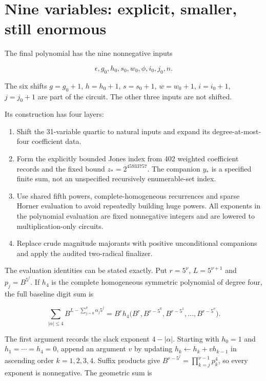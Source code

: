 \documentclass[
  10pt,
]{article}
\providecommand{\tightlist}{%
  \setlength{\itemsep}{0pt}\setlength{\parskip}{0pt}}
\let\oldsection\section
\renewcommand{\section}{\clearpage\oldsection}
\begin{document}
\section{Nine variables: explicit, smaller, still
enormous}\label{nine-variables-explicit-smaller-still-enormous}

The final polynomial has the nine nonnegative inputs

\[\epsilon, g_0, h_0, s_0, w_0,\phi, i_0, j_0, n.\]

The six shifts \(g=g_0+1\), \(h=h_0+1\), \(s=s_0+1\), \(w=w_0+1\),
\(i=i_0+1\), \(j=j_0+1\) are part of the circuit. The other three inputs
are not shifted.

Its construction has four layers:

\begin{enumerate}
\def\labelenumi{\arabic{enumi}.}
\tightlist
\item
  Shift the 31-variable quartic to natural inputs and expand its
  degree-at-most-four coefficient data.
\item
  Form the explicitly bounded Jones index from 402 weighted coefficient
  records and the fixed bound \(z_*=2^{45933757}\). The companion
  \(y_*\) is a specified finite sum, not an unspecified recursively
  enumerable-set index.
\item
  Use shared fifth powers, complete-homogeneous recurrences and sparse
  Horner evaluation to avoid repeatedly building huge powers. All
  exponents in the polynomial evaluation are fixed nonnegative integers
  and are lowered to multiplication-only circuits.
\item
  Replace crude magnitude majorants with positive unconditional
  companions and apply the audited two-radical finalizer.
\end{enumerate}

The evaluation identities can be stated exactly. Put \(r=5^\nu\),
\(L=5^{\nu+1}\) and \(p_j=B^{5^j}\). If \(h_4\) is the complete
homogeneous symmetric polynomial of degree four, the full baseline digit
sum is

\[\sum_{|\alpha|\le4}B^{L-\sum_{j=0}^{\nu}\alpha_j5^j}
=B^r h_4\bigl(B^r, B^{r-5^0}, B^{r-5^1},\ldots, B^{r-5^\nu}\bigr).\]

The first argument records the slack exponent \(4-|\alpha|\). Starting
with \(h_0=1\) and \(h_1=\cdots=h_4=0\), append an argument \(v\) by
updating \(h_k\leftarrow h_k+vh_{k-1}\) in ascending order
\(k=1,2,3,4\). Suffix products give
\(B^{r-5^j}=\prod_{k=j}^{\nu-1}p_k^4\), so every exponent is
nonnegative. The geometric sum is
\end{document}
